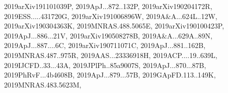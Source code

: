 \documentclass[12pt]{article}
\begin{document}
\begin{description}
{2019arXiv191101039P,%
2019ApJ...872..132P,%
2019arXiv190204172R,%
2019ESS.....431720G,%
2019arXiv191006896W,%
2019A&A...624L..12W,%
2019arXiv190304363K,%
2019MNRAS.488.5065E,%
2019arXiv190100423P,%
2019ApJ...886...21V,%
2019arXiv190508278B,%
2019A&A...629A..89N,%
2019ApJ...887....6C,%
2019arXiv190711071C,%
2019ApJ...881..162B,%
2019MNRAS.487..975R,%
2019AAS...23336918H,%
2019ACP....19..639L,%
2019IJCFD..33...43A,%
2019JPlPh..85a9007S,%
2019ApJ...870...87B,%
2019PhRvF...4b4608B,%
2019ApJ...879...57B,%
2019GApFD.113..149K,%
2019MNRAS.483.5623M,%
}
\end{description}
\end{document}
